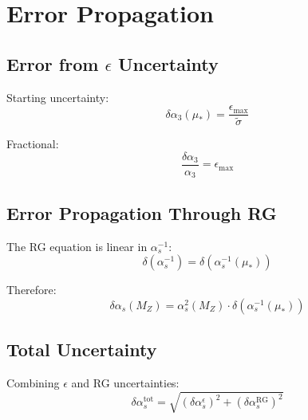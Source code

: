 \documentclass[11pt,a4paper]{article}
\theoremstyle{definition}
\begin{document}
\section{Error Propagation}
\label{app:error-prop}

\subsection{Error from $\epsilon$ Uncertainty}
\label{subsec:error-eps}

Starting uncertainty:
\begin{equation}
\label{eq:error-eps-start}
\delta\alpha_3(\mu_*) = \frac{\epsilon_{\max}}{\tilde{\sigma}}
\end{equation}

Fractional:
\begin{equation}
\label{eq:error-eps-frac}
\frac{\delta\alpha_3}{\alpha_3} = \epsilon_{\max}
\end{equation}

\subsection{Error Propagation Through RG}
\label{subsec:error-rg-prop}

The RG equation is linear in $\alpha_s^{-1}$:
\begin{equation}
\label{eq:error-rg-linear}
\delta(\alpha_s^{-1}) = \delta(\alpha_s^{-1}(\mu_*))
\end{equation}

Therefore:
\begin{equation}
\label{eq:error-alpha-mz}
\delta\alpha_s(M_Z) = \alpha_s^2(M_Z) \cdot \delta(\alpha_s^{-1}(\mu_*))
\end{equation}

\subsection{Total Uncertainty}
\label{subsec:total-uncert}

Combining $\epsilon$ and RG uncertainties:
\begin{equation}
\label{eq:total-uncert}
\delta\alpha_s^{\text{tot}} = \sqrt{(\delta\alpha_s^{\epsilon})^2 + (\delta\alpha_s^{\text{RG}})^2}
\end{equation}
\end{document}
